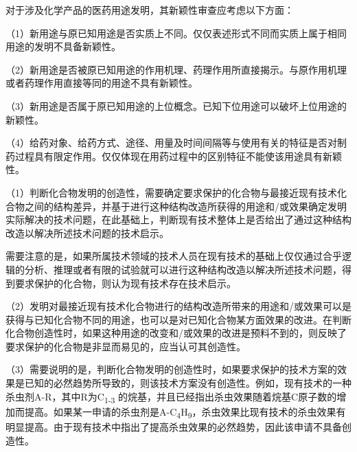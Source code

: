 对于涉及化学产品的医药用途发明，其新颖性审查应考虑以下方面：

{\setlength{\parindent}{17.1bp}（1）新用途与原已知用途是否实质上不同。仅仅表述形式不同而实质上属于相同用途的发明不具备新颖性。\par}

{\setlength{\parindent}{17.1bp}（2）新用途是否被原已知用途的作用机理、药理作用所直接揭示。与原作用机理或者药理作用直接等同的用途不具有新颖性。\par}

{\setlength{\parindent}{17.1bp}（3）新用途是否属于原已知用途的上位概念。已知下位用途可以破坏上位用途的新颖性。\par}

{\setlength{\parindent}{17.1bp}（4）给药对象、给药方式、途径、用量及时间间隔等与使用有关的特征是否对制药过程具有限定作用。仅仅体现在用药过程中的区别特征不能使该用途具有新颖性。\par}

{\setlength{\parindent}{17.1bp}（1）判断化合物发明的创造性，需要确定要求保护的化合物与最接近现有技术化合物之间的结构差异，并基于进行这种结构改造所获得的用途和/或效果确定发明实际解决的技术问题，在此基础上，判断现有技术整体上是否给出了通过这种结构改造以解决所述技术问题的技术启示。\par}

需要注意的是，如果所属技术领域的技术人员在现有技术的基础上仅仅通过合乎逻辑的分析、推理或者有限的试验就可以进行这种结构改造以解决所述技术问题，得到要求保护的化合物，则认为现有技术存在技术启示。

{\setlength{\parindent}{17.1bp}（2）发明对最接近现有技术化合物进行的结构改造所带来的用途和/或效果可以是获得与已知化合物不同的用途，也可以是对已知化合物某方面效果的改进。在判断化合物创造性时，如果这种用途的改变和/或效果的改进是预料不到的，则反映了要求保护的化合物是非显而易见的，应当认可其创造性。\par}

{\setlength{\parindent}{17.1bp}（3）需要说明的是，判断化合物发明的创造性时，如果要求保护的技术方案的效果是已知的必然趋势所导致的，则该技术方案没有创造性。例如，现有技术的一种杀虫剂A-R，其中R为C\textsubscript{1-3} 的烷基，并且已经指出杀虫效果随着烷基C原子数的增加而提高。如果某一申请的杀虫剂是A-C\textsubscript{4}H\textsubscript{9}，杀虫效果比现有技术的杀虫效果有明显提高。由于现有技术中指出了提高杀虫效果的必然趋势，因此该申请不具备创造性。\par}

